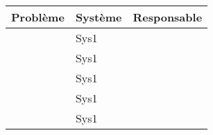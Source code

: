\Large\begin{tabularx}{\linewidth}{
    |>{\hsize=2.0\hsize}X|%
    >{\hsize=1.2\hsize}X|%
    >{\hsize=0.6\hsize}X|%
  }
    \hline
    Problème & Système & Responsable \\\hline
      & Sys1 &   \\\hline
      & Sys1 &   \\\hline
      & Sys1 &   \\\hline
      & Sys1 &   \\\hline
      & Sys1 &   \\\hline
  \end{tabularx}
     